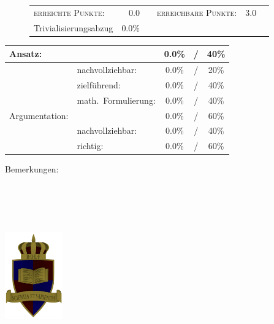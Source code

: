 \documentclass{article}
\begin{document}
\vspace{-0.5cm}
\begin{figure}[h!]
\begin{tabular}{lrcrcr}
\textsc{erreichte Punkte:} &0.0& & \textsc{erreichbare Punkte:} &3.0\\
\small Trivialisierungsabzug  & 0.0\% & & &
\end{tabular}
\end{figure}
\vspace{-0.1cm}
\begin{minipage}[t]{0.6\textwidth}
\flushleft
\begin{tabular}{l|lccc}
Ansatz:& &0.0\%&/&40\%\\\hline
&nachvollziehbar:&0.0\%&/&20\%\\
&zielf{\"u}hrend:&0.0\%&/&40\%\\
&math.~Formulierung:& 0.0\%&/&40\%\\\hline\hline
Argumentation:& &0.0\%&/&60\%\\\hline
&nachvollziehbar:&0.0\%&/&40\%\\
&richtig:&0.0\%&/&60\%\\\hline
\end{tabular}
\end{minipage}
\hfill
\begin{minipage}[t]{0.4\textwidth}
	\vspace{-1.75cm}
	Bemerkungen:\\\vspace*{0.2cm}
	\underline{\hspace{0.95\textwidth}}\\\vspace*{0.2cm}
	\underline{\hspace{0.95\textwidth}}
	\\\vspace*{0.2cm}
	\underline{\hspace{0.95\textwidth}}
	\\\vspace*{0.2cm}
	\underline{\hspace{0.95\textwidth}}
	\\\vspace*{0.2cm}
	\underline{\hspace{0.95\textwidth}}
\end{minipage}
	\vspace{0.5cm}\clearpage\vspace*{-2cm}
\parbox{4cm}{\includegraphics[width=2.5cm]{../images/ROLF4.png}}
\end{document}
